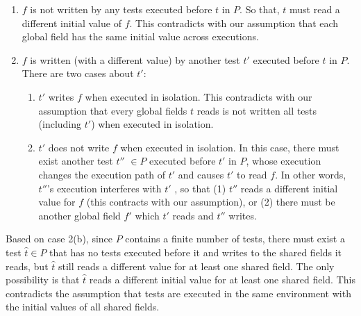 \documentclass[12pt]{article}
\begin{document}
\begin{enumerate}
\item $f$ is not written by any tests executed before $t$ in $P$. So that, $t$ must
read a different initial value of $f$. This contradicts with our assumption
that each global field has the same initial value across executions.

\item $f$ is written (with a different value) by another test $t'$
executed before $t$ in $P$. There are two cases about $t'$:

\begin{enumerate}
\item $t'$ writes $f$ when executed in isolation. This contradicts with our
assumption that every global fields $t$ reads is not written all tests
(including $t'$) when executed in isolation.

\item $t'$ does not write $f$ when executed in isolation. In this case, there must exist another test $t''$ $\in P$ executed before $t'$
in $P$, whose execution changes the execution path of $t'$
and causes $t'$ to read $f$. In other words, $t''$'s execution interferes with $t'$ , so that (1) $t''$ reads a different initial value for $f$
(this contracts with our assumption), or (2) there must be another global field $f'$ which $t'$ reads and $t''$ writes.
\end{enumerate}

\end{enumerate}

Based on case 2(b), since $P$ contains a finite number of tests, there must exist a test $\hat{t} \in P$ that has no tests 
executed before it and writes to the shared 
fields it reads, but $\hat{t}$ still reads a
 different value for at least one shared field. The only possibility is that $\hat{t}$ reads a different initial value
for at least one shared field. This contradicts the assumption that tests are
executed in the same environment with the initial values of all shared 
fields.
\end{document}
